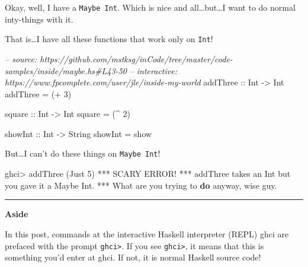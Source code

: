 \documentclass[]{article}
\newenvironment{Shaded}{}{}
\newcommand{\KeywordTok}[1]{\textcolor[rgb]{0.00,0.44,0.13}{\textbf{{#1}}}}
\newcommand{\DataTypeTok}[1]{\textcolor[rgb]{0.56,0.13,0.00}{{#1}}}
\newcommand{\DecValTok}[1]{\textcolor[rgb]{0.25,0.63,0.44}{{#1}}}
\newcommand{\CommentTok}[1]{\textcolor[rgb]{0.38,0.63,0.69}{\textit{{#1}}}}
\newcommand{\OtherTok}[1]{\textcolor[rgb]{0.00,0.44,0.13}{{#1}}}
\newcommand{\FunctionTok}[1]{\textcolor[rgb]{0.02,0.16,0.49}{{#1}}}
\newcommand{\NormalTok}[1]{{#1}}
\begin{document}
Okay, well, I have a \texttt{Maybe\ Int}. Which is nice and
all\ldots{}but\ldots{}I want to do normal inty-things with it.

That is\ldots{}I have all these functions that work only on
\texttt{Int}!

\begin{Shaded}
\begin{Highlighting}[]
\CommentTok{-- source: https://github.com/mstksg/inCode/tree/master/code-samples/inside/maybe.hs#L43-50}
\CommentTok{-- interactive: https://www.fpcomplete.com/user/jle/inside-my-world}
\OtherTok{addThree ::} \DataTypeTok{Int} \OtherTok{->} \DataTypeTok{Int}
\NormalTok{addThree }\FunctionTok{=} \NormalTok{(}\FunctionTok{+} \DecValTok{3}\NormalTok{)}

\OtherTok{square ::} \DataTypeTok{Int} \OtherTok{->} \DataTypeTok{Int}
\NormalTok{square }\FunctionTok{=} \NormalTok{(}\FunctionTok{^} \DecValTok{2}\NormalTok{)}

\NormalTok{showInt}\OtherTok{ ::} \DataTypeTok{Int} \OtherTok{->} \DataTypeTok{String}
\NormalTok{showInt }\FunctionTok{=} \NormalTok{show}
\end{Highlighting}
\end{Shaded}

But\ldots{}I can't do these things on \texttt{Maybe\ Int}!

\begin{Shaded}
\begin{Highlighting}[]
\NormalTok{ghci}\FunctionTok{>} \NormalTok{addThree (}\DataTypeTok{Just} \DecValTok{5}\NormalTok{)}
\FunctionTok{***} \DataTypeTok{SCARY} \DataTypeTok{ERROR}\FunctionTok{!}
\FunctionTok{***} \NormalTok{addThree takes an }\DataTypeTok{Int} \NormalTok{but you gave it a }\DataTypeTok{Maybe} \DataTypeTok{Int}\FunctionTok{.}
\FunctionTok{***} \DataTypeTok{What} \NormalTok{are you trying to }\KeywordTok{do} \NormalTok{anyway, wise guy}\FunctionTok{.}
\end{Highlighting}
\end{Shaded}

\begin{center}\rule{0.5\linewidth}{\linethickness}\end{center}

\textbf{Aside}

In this post, commands at the interactive Haskell interpreter (REPL)
ghci are prefaced with the prompt \texttt{ghci\textgreater{}}. If you
see \texttt{ghci\textgreater{}}, it means that this is something you'd
enter at ghci. If not, it is normal Haskell source code!
\end{document}
